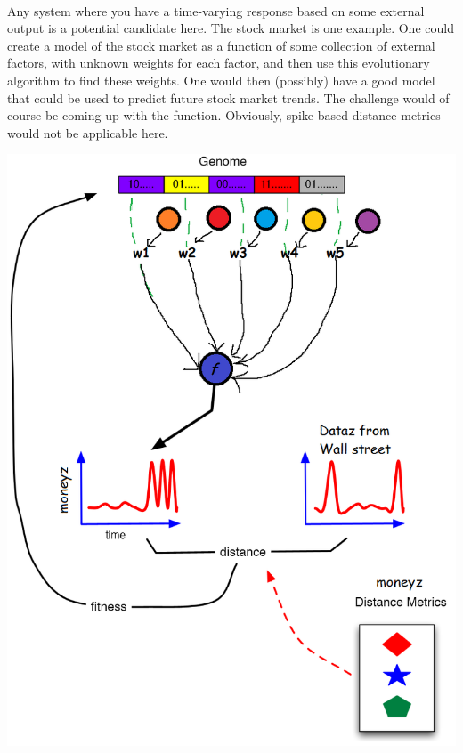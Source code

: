 \documentclass[a4paper,12pt]{article}
\begin{document}
\paragraph{}Any system where you have a time-varying response based on some external output is a potential candidate here. The stock market is one example. One could create a model of the stock market as a function of some collection of external factors, with unknown weights for each factor, and then use this evolutionary algorithm to find these weights. One would then (possibly) have a good model that could be used to predict future stock market trends. The challenge would of course be coming up with the function. Obviously, spike-based distance metrics would not be applicable here.\\
\centerline{\includegraphics[width=1\textwidth]{img/moneyz}}
\end{document}
